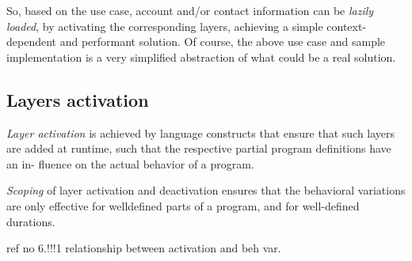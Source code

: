 \documentclass{acm_proc_article-sp}
\begin{document}
So, based on the use case, account and/or contact information can be \textit{lazily loaded}, by activating the corresponding layers, achieving a simple context-dependent and performant solution. Of course, the above use case and sample implementation is a very simplified abstraction of what could be a real solution.

\subsection{Layers activation}
\textit{Layer activation} is achieved by language constructs that
ensure that such layers are added at runtime, such that
the respective partial program definitions have an in-
fluence on the actual behavior of a program.

\textit{Scoping} of layer activation and deactivation ensures that
the behavioral variations are only effective for welldefined
parts of a program, and for well-defined durations.

ref no 6.!!!1 relationship between activation and beh var.



\end{document}
